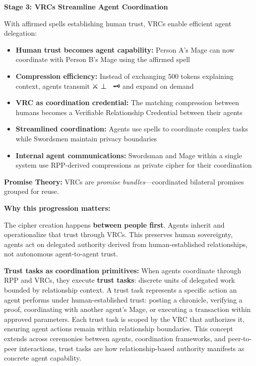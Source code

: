 \documentclass[
  11pt,
]{article}
\begin{document}
\textbf{Stage 3: VRCs Streamline Agent Coordination}

With affirmed spells establishing human trust, VRCs enable efficient
agent delegation:

\begin{itemize}
\item
  \textbf{Human trust becomes agent capability:} Person A's Mage can now
  coordinate with Person B's Mage using the affirmed spell
\item
  \textbf{Compression efficiency:} Instead of exchanging 500 tokens
  explaining context, agents transmit ⚔️ ⊥ 🔮 \textbar{} 🗝️ and expand
  on demand
\item
  \textbf{VRC as coordination credential:} The matching compression
  between humans becomes a Verifiable Relationship Credential between
  their agents
\item
  \textbf{Streamlined coordination:} Agents use spells to coordinate
  complex tasks while Swordsmen maintain privacy boundaries
\item
  \textbf{Internal agent communications:} Swordsman and Mage within a
  single system use RPP-derived compressions as private cipher for their
  coordination
\end{itemize}

\textbf{Promise Theory:} VRCs are \emph{promise bundles}---coordinated
bilateral promises grouped for reuse.

\textbf{Why this progression matters:}

The cipher creation happens \textbf{between people first}. Agents
inherit and operationalize that trust through VRCs. This preserves human
sovereignty, agents act on delegated authority derived from
human-established relationships, not autonomous agent-to-agent trust.

\textbf{Trust tasks as coordination primitives:} When agents coordinate
through RPP and VRCs, they execute \textbf{trust tasks}: discrete units
of delegated work bounded by relationship context. A trust task
represents a specific action an agent performs under human-established
trust: posting a chronicle, verifying a proof, coordinating with another
agent's Mage, or executing a transaction within approved parameters.
Each trust task is scoped by the VRC that authorizes it, ensuring agent
actions remain within relationship boundaries. This concept extends
across ceremonies between agents, coordination frameworks, and
peer-to-peer interactions, trust tasks are how relationship-based
authority manifests as concrete agent capability.
\end{document}

